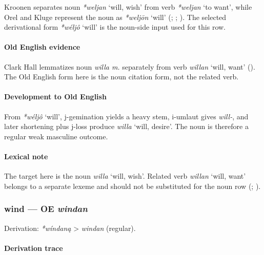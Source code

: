 \documentclass[
  british,
  a4paper,
]{article}
\providecommand{\Recon}[1]{\emph{*#1}}
\begin{document}
Kroonen separates noun \Recon{weljan} `will, wish' from verb
\Recon{weljan} `to want', while Orel and Kluge represent the noun as
\Recon{weljōn} `will' (;
;
). The selected derivational
form \Recon{wéljô} `will' is the noun-side input used for this row.

\paragraph{Old English evidence}\label{old-english-evidence-81}

Clark Hall lemmatizes noun \emph{willa m.} separately from verb
{\emph{willan}} `will, want' (). The Old English form here is the noun citation form, not
the related verb.

\paragraph{Development to Old
English}\label{development-to-old-english-80}

From \Recon{wéljô} `will', j-gemination yields a heavy stem, i-umlaut
gives \emph{will-}, and later shortening plus j-loss produce
{\emph{willa}} `will, desire'. The noun is therefore a regular weak
masculine outcome.

\paragraph{Lexical note}\label{lexical-note-4}

The target here is the noun \emph{willa} `will, wish'. Related verb
{\emph{willan}} `will, want' belongs to a separate lexeme and should not
be substituted for the noun row (; ).

\subsubsection{\texorpdfstring{wind --- OE
\emph{windan}}{wind --- OE windan}}\label{wind-oe-windan}

Derivation: \emph{*wíndaną} \textgreater{} \emph{windan} (regular).

\paragraph{Derivation trace}\label{derivation-trace-100}
\end{document}
